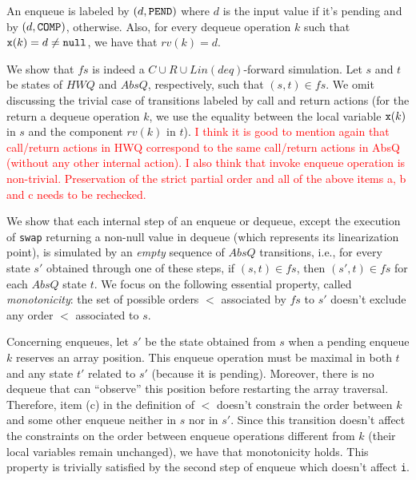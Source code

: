 An enqueue is labeled by $(d,{\tt PEND})$ where $d$ is the input value if it's pending and by  $(d,{\tt COMP})$, otherwise. Also, for every dequeue operation $k$ such that ${\tt x}(k)=d\neq {\tt null}$, we have that $rv(k)=d$.

We show that $\mathit{fs}$ is indeed a $C\cup R\cup Lin(deq)$-forward simulation. Let $s$ and $t$ be states of $\mathit{HWQ}$ and $AbsQ$, respectively, such that $(s,t)\in\mathit{fs}$. 
We omit discussing the trivial case of transitions labeled by call and return actions (for the return a dequeue operation $k$, we use the equality between the local variable ${\tt x}(k)$ in $s$ and the component $rv(k)$ in $t$). \textcolor{red}{ I think it is good to mention again that call/return actions in HWQ correspond to the same call/return actions in AbsQ (without any other internal action). I also think that invoke enqueue operation is non-trivial. Preservation of the strict partial order and all of the above items a, b and c needs to be rechecked.}

We show that each internal step of an enqueue or dequeue, except the execution of {\tt swap} returning a non-null value in dequeue (which represents its linearization point), is simulated by an \emph{empty} sequence of $AbsQ$ transitions, i.e., for every state $s'$ obtained through one of these steps, if $(s,t)\in\mathit{fs}$, then $(s',t)\in\mathit{fs}$ for each $AbsQ$ state $t$. We focus on the following essential property, called \emph{monotonicity}: the set of possible orders $<$ associated by $\mathit{fs}$ to $s'$ doesn't exclude any order $<$ associated to $s$.

Concerning enqueues, let $s'$ be the state obtained from $s$ when a pending enqueue $k$ reserves an array position. This enqueue operation must be maximal in both $t$ and any state $t'$ related to $s'$ (because it is pending). Moreover, there is no dequeue that can ``observe'' this position before restarting the array traversal. Therefore, item (c) in the definition of $<$ doesn't constrain the order between $k$ and some other enqueue neither in $s$ nor in $s'$. Since this transition doesn't affect the constraints on the order between enqueue operations different from $k$ (their local variables remain unchanged), we have that monotonicity holds. This property is trivially satisfied by the second step of enqueue which doesn't affect {\tt i}.

